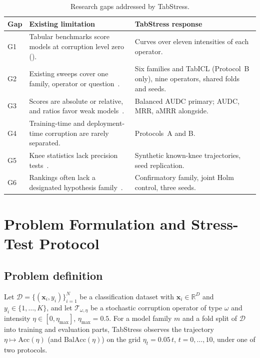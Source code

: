 \documentclass[pdflatex,sn-mathphys]{sn-jnl}
\theoremstyle{thmstyleone}
\theoremstyle{thmstyletwo}
\theoremstyle{thmstylethree}
\newcommand{\Acc}{\mathrm{Acc}}
\newcommand{\BalAcc}{\mathrm{BalAcc}}
\newcommand{\etamax}{\eta_{\max}}
\begin{document}
\begin{table}[t]
\centering
\footnotesize
\caption{Research gaps addressed by TabStress.}\label{tab:gaps}
\begin{tabular}{@{}p{0.6cm}p{4.8cm}p{5.4cm}@{}}
\toprule
Gap & Existing limitation & TabStress response \\
\midrule
G1 & Tabular benchmarks score models at corruption level zero (\cite{grinsztajn2022tree}). & Curves over eleven intensities of each operator. \\
G2 & Existing sweeps cover one family, operator or question~\cite{zhu2004class,mohammed2025effects}. & Six families and TabICL (Protocol~B only), nine operators, shared folds and seeds. \\
G3 & Scores are absolute or relative, and ratios favor weak models~\cite{hendrycks2019benchmarking,saez2015evaluating}. & Balanced AUDC primary; AUDC, MRR, aMRR alongside. \\
G4 & Training-time and deployment-time corruption are rarely separated. & Protocols~A and B. \\
G5 & Knee statistics lack precision tests~\cite{satopaa2011finding}. & Synthetic known-knee trajectories, seed replication. \\
G6 & Rankings often lack a designated hypothesis family~\cite{demsar2006statistical}. & Confirmatory family, joint Holm control, three seeds. \\
\bottomrule
\end{tabular}
\end{table}

\section{Problem Formulation and Stress-Test Protocol}\label{sec:problem}

\subsection{Problem definition}\label{sec:problem:def}

Let $\mathcal{D}=\{(\mathbf{x}_i,y_i)\}_{i=1}^{N}$ be a classification dataset with $\mathbf{x}_i\in\mathbb{R}^{D}$ and $y_i\in\{1,\dots,K\}$, and let $\mathcal{T}_{\omega,\eta}$ be a stochastic corruption operator of type $\omega$ and intensity $\eta\in[0,\etamax]$, $\etamax=0.5$. For a model family $m$ and a fold split of $\mathcal{D}$ into training and evaluation parts, TabStress observes the trajectory $\eta\mapsto\Acc(\eta)$ (and $\BalAcc(\eta)$) on the grid $\eta_t=0.05\,t$, $t=0,\dots,10$, under one of two protocols.
\end{document}
